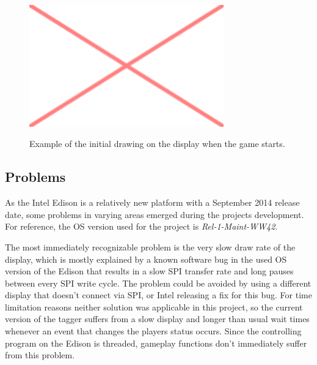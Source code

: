 \begin{figure}[h!]
\centering
\includegraphics[width=0.75\textwidth]{images/placeholder.png}\\
\caption[Edison Tagger Display]{Example of the initial drawing on the display when the game starts.}
\label{fig:tag_ed_dsp}
\end{figure}


\subsection{Problems}
As the Intel Edison is a relatively new platform with a September 2014 release date, some problems in varying areas emerged during the projects development. For reference, the OS version used for the project is \textit{Rel-1-Maint-WW42}.

The most immediately recognizable problem is the very slow draw rate of the display, which is mostly explained by a known software bug in the used OS version of the Edison that results in a slow SPI transfer rate and long pauses between every SPI write cycle. The problem could be avoided by using a different display that doesn't connect via SPI, or Intel releasing a fix for this bug. For time limitation reasons neither solution was applicable in this project, so the current version of the tagger suffers from a slow display and longer than usual wait times whenever an event that changes the players status occurs. Since the controlling program on the Edison is threaded, gameplay functions don't immediately suffer from this problem.

